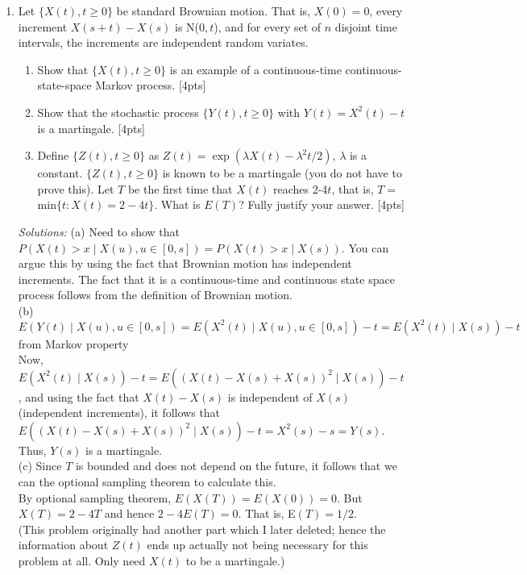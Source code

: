 \documentclass[12pt]{article}
\begin{document}
\begin{enumerate}
\newpage

 \item  Let $\{X(t),t\geq 0\}$ be standard Brownian motion. That is,
   $X(0)=0$, every increment $X(s+t)-X(s)$ is N($0,t$), and for every
   set of $n$ disjoint time intervals, the increments are independent
   random variates.
 \begin{enumerate}
 \item Show that $\{X(t),t\geq 0\}$ is an example of a continuous-time
   continuous-state-space Markov process. [4pts]
 \item Show that the stochastic process $\{Y(t),t\geq 0\}$ with
  $Y(t)=X^2(t) - t$ is a martingale.  [4pts]
 \item Define $\{Z(t),t\geq 0\}$ as $Z(t)=\exp(\lambda X(t) - \lambda^2
   t/2)$, 
  $\lambda$ is a constant. $\{Z(t),t\geq 0\}$ is known to be a martingale (you
   do not have to prove this). Let $T$ be the first time that $X(t)$
   reaches 2-4$t$, that is,  $T=$min$\{t: X(t)= 2-4t\}$. What is
   $E(T)$? Fully justify your answer. [4pts]
 \end{enumerate}
{\it Solutions: } (a) Need to show that $P(X(t)> x\mid X(u), u\in [0,s]) = P(X(t)> x\mid X(s))$. You can argue this by using the fact that Brownian motion has independent increments. The fact that it is a continuous-time and continuous state space process follows from the definition of Brownian motion.\\
(b) $E(Y(t)\mid X(u), u\in [0,s]) = E(X^2(t)\mid X(u), u\in [0,s]) - t = E(X^2(t)\mid X(s)) - t$ from Markov property\\
Now, 
 $E(X^2(t)\mid X(s)) - t= E((X(t)-X(s)+X(s))^2\mid X(s)) - t$, and using the fact that $X(t)-X(s) $ is independent of $X(s)$ (independent increments), it follows that $E((X(t)-X(s)+X(s))^2\mid X(s))- t = X^2(s) - s = Y(s)$. Thus, $Y(s)$ is a martingale.\\
(c) Since $T$ is bounded and does not depend on the future, it follows that we can the optional sampling theorem to calculate this. \\
By optional sampling theorem, $E(X(T))=E(X(0))=0$. But $X(T)=2-4T$ and hence $2-4E(T)=0$. That is, E$(T)=1/2$. \\
(This problem originally had another part which I later deleted; hence the information about $Z(t)$ ends up actually not being necessary for this problem at all. Only need $X(t)$ to be a martingale.)


\end{enumerate}
\end{document}
